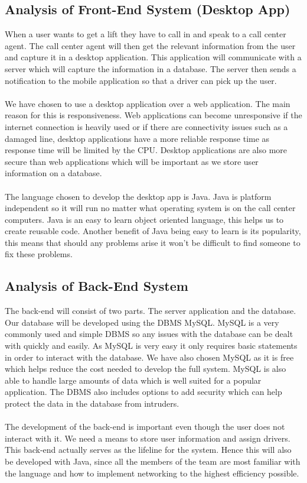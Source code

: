 \documentclass[a4paper,12pt]{article}
\begin{document}
\subsection{Analysis of Front-End System (Desktop App)}
When a user wants to get a lift they have to call in and speak to a call center agent. The call center agent will then get the relevant information from the user and capture it in a desktop application. This application will communicate with a server which will capture the information in a database. The server then sends a notification to the mobile application so that a driver can pick up the user.\\\\
We have chosen to use a desktop application over a web application. The main reason for this is responsiveness. Web applications can become unresponsive if the internet connection is heavily used or if there are connectivity issues such as a damaged line, desktop applications have a more reliable response time as response time will be limited by the CPU. Desktop applications are also more secure than web applications which will be important as we store user information on a database.\\\\
The language chosen to develop the desktop app is Java. Java is platform independent so it will run no matter what operating system is on the call center computers. Java is an easy to learn object oriented language, this helps us to create reusable code. Another benefit of Java being easy to learn is its popularity, this means that should any problems arise it won't be difficult to find someone to fix these problems.
\newpage
\subsection{Analysis of Back-End System}
The back-end will consist of two parts. The server application and the database.
Our database will be developed using the DBMS MySQL. MySQL is a very commonly used and simple DBMS so any issues with the database can be dealt with quickly and easily. As MySQL is very easy it only requires basic statements in order to interact with the database. We have also chosen MySQL as it is free which helps reduce the cost needed to develop the full system. MySQL is also able to handle large amounts of data which is well suited for a popular application. The DBMS also includes options to add security which can help protect the data in the database from intruders.
\\\\
The development of the back-end is important even though the user does not interact with it. We need a means to store user information and assign drivers. This back-end actually serves as the lifeline for the system. Hence this will also be developed with Java, since all the members of the team are most familiar with the language and how to implement networking to the highest efficiency possible.
\end{document}
